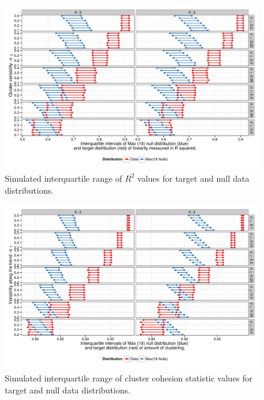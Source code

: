 \documentclass[11pt]{isuthesis}\usepackage[]{graphicx}\usepackage[]{color}
\newenvironment{knitrout}{}{} %
\begin{document}
\begin{figure}[ht]\centering
\begin{knitrout}
\color{fgcolor}

{\centering \includegraphics[width=.8\linewidth]{Figure/FeatureHierarchy/fig-simulationparameters-r2-1} 

}



\end{knitrout}
\caption[Simulated IQR of $R^2$ values]{Simulated interquartile range of $R^2$ values for target and null data distributions. \label{fig:simulationLineIntervals}}
\end{figure}

\begin{figure}[ht]\centering
\begin{knitrout}
\color{fgcolor}

{\centering \includegraphics[width=.8\linewidth]{Figure/FeatureHierarchy/fig-simulationparameters-cluster-1} 

}



\end{knitrout}
\caption[Simulated IQR of cluster cohesion statistic values]{Simulated interquartile range of cluster cohesion statistic values for target and null data distributions. \label{fig:simulationClusterIntervals}}
\end{figure}
\end{document}
